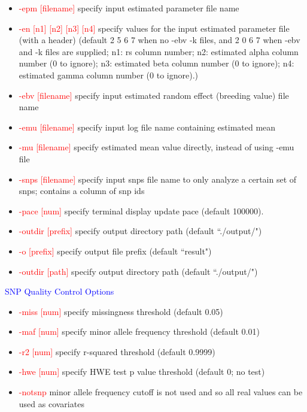 \documentclass[11pt]{article}
\begin{document}
\begin{itemize}
\item  \textcolor{red}{ -epm        [filename] }     \quad    specify input estimated parameter file name
\item  \textcolor{red}{ -en [n1]  [n2]  [n3]  [n4]}     \quad    specify values for the input estimated parameter file (with a header) (default 2 5 6 7 when no -ebv -k files, and 2 0 6 7 when -ebv and -k files are supplied; n1: rs column number; n2: estimated alpha column number (0 to ignore); n3: estimated beta column number (0 to ignore); n4: estimated gamma column number (0 to ignore).)
\item  \textcolor{red}{ -ebv        [filename] }     \quad    specify input estimated random effect (breeding value) file name
\item  \textcolor{red}{ -emu        [filename] }     \quad    specify input log file name containing estimated mean
\item  \textcolor{red}{ -mu        [filename] }     \quad    specify estimated mean value directly, instead of using -emu file
\item  \textcolor{red}{ -snps        [filename] }     \quad    specify input snps file name to only analyze a certain set of snps; contains a column of snp ids
\item  \textcolor{red}{ -pace     [num]}     \quad           specify terminal display update pace (default 100000).
\item  \textcolor{red}{ -outdir        [prefix]}     \quad        specify output directory path (default ``./output/")
\item  \textcolor{red}{ -o        [prefix]}     \quad        specify output file prefix (default ``result")
\item  \textcolor{red}{ -outdir        [path]}     \quad        specify output directory path (default ``./output/")
\end{itemize}
%
\textcolor{blue}{SNP Quality Control Options}
%
\begin{itemize}
\item  \textcolor{red}{-miss     [num] }     \quad          specify missingness threshold (default 0.05)
\item  \textcolor{red}{-maf      [num] }     \quad          specify minor allele frequency threshold (default 0.01)
\item  \textcolor{red}{-r2      [num] }     \quad           specify r-squared threshold (default 0.9999)
\item  \textcolor{red}{-hwe      [num] }     \quad           specify HWE test p value threshold (default 0; no test)
\item  \textcolor{red}{-notsnp  }     \quad          minor allele frequency cutoff is not used and so all real values can be used as covariates
\end{itemize}
\end{document}
